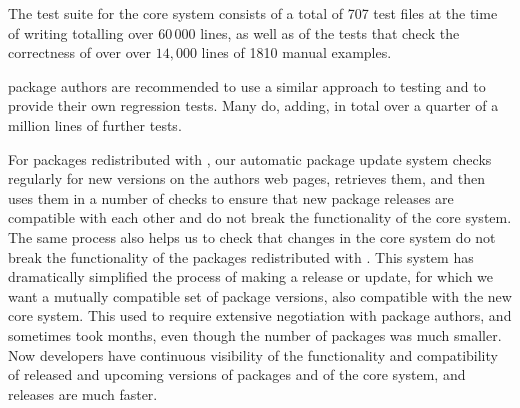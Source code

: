 \documentclass{deliverablereport}
\renewcommand{\comment}[1]{\TODO{Comment: #1}}
\begin{document}
The \GAP test
suite for the core system consists of a total of 707 test files at the time of writing
totalling over $60\,000$ lines,
as well as of the tests that check the correctness of over
over $14,000$ lines of 1810 manual examples.
%

\GAP package authors are recommended to 
use a similar approach to testing and to provide their own regression
tests. Many do, adding, in total over a quarter of a million lines of
further tests.

For packages redistributed with \GAP, our automatic package update system
checks regularly for new versions on the authors web pages, retrieves them, and then uses them in a
number of checks to ensure that new package releases are compatible with
each other and do not break the functionality of the core \GAP system. The
same process also helps us to check that changes in the core \GAP system
do not break the functionality of the packages redistributed with \GAP.
This system has dramatically simplified the process of making a \GAP
release or update, for which we want a mutually compatible set of
package versions, also compatible with the new core system. This used
to require extensive negotiation with package authors, and sometimes
took months, even though the number of packages was much smaller. Now
developers have continuous visibility of the functionality and
compatibility of released and upcoming versions of packages and of the
core system, and releases are much faster.
\end{document}
